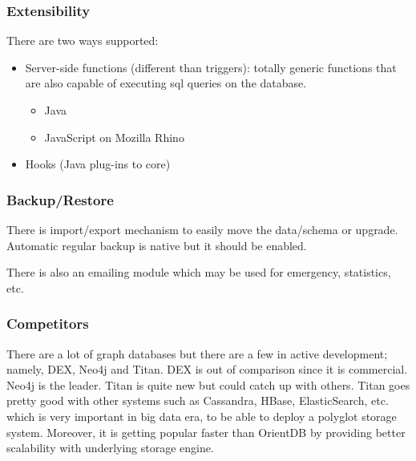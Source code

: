 \subsubsection*{Extensibility}

There are two ways supported:
\begin{itemize}
  \item Server-side functions (different than triggers): totally generic functions that are also capable of executing sql queries on the database.
  \begin{itemize}
    \item Java
    \item JavaScript on Mozilla Rhino
  \end{itemize}
  \item Hooks (Java plug-ins to core)
\end{itemize}

\subsubsection*{Backup/Restore}

There is import/export mechanism to easily move the data/schema or upgrade. Automatic regular backup is native but it should be enabled.

There is also an emailing module which may be used for emergency, statistics, etc.

\subsubsection*{Competitors}

There are a lot of graph databases but there are a few in active development; namely, DEX, Neo4j and Titan. DEX is out of comparison since it is commercial. Neo4j is the leader. Titan is quite new but could catch up with others. Titan goes pretty good with other systems such as Cassandra, HBase, ElasticSearch, etc. which is very important in big data era, to be able to deploy a polyglot storage system. Moreover, it is getting popular faster than OrientDB by providing better scalability with underlying storage engine.

